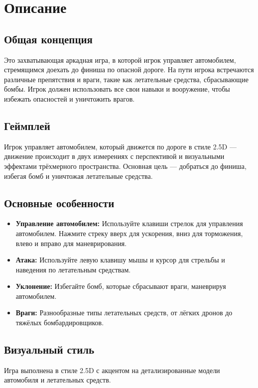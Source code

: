 \section{Описание}

\subsection{Общая концепция}
Это захватывающая аркадная игра, в которой игрок управляет автомобилем,
стремящимся доехать до финиша по опасной дороге.
На пути игрока встречаются различные препятствия и враги,
такие как летательные средства, сбрасывающие бомбы.
Игрок должен использовать все свои навыки и вооружение,
чтобы избежать опасностей и уничтожить врагов.

\subsection{Геймплей}
Игрок управляет автомобилем, который движется по дороге
в стиле 2.5D --- движение происходит в двух измерениях с перспективой
и визуальными эффектами трёхмерного пространства.
Основная цель --- добраться до финиша, избегая бомб
и уничтожая летательные средства.

\subsection{Основные особенности}
\begin{itemize}
    \item \textbf{Управление автомобилем:} Используйте клавиши стрелок
		для управления автомобилем. Нажмите стреку вверх для ускорения,
		вниз для торможения, влево и вправо для маневрирования.
    \item \textbf{Атака:} Используйте левую клавишу мышы и курсор
		для стрельбы и наведения по летательным средствам.
    \item \textbf{Уклонение:} Избегайте бомб,
		которые сбрасывают враги, маневрируя автомобилем.
    \item \textbf{Враги:} Разнообразные типы летательных средств,
		от лёгких дронов до тяжёлых бомбардировщиков.
\end{itemize}

\subsection{Визуальный стиль}
Игра выполнена в стиле 2.5D с акцентом на детализированные модели автомобиля
и летательных средств.

